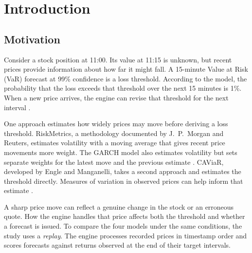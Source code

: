 \documentclass[
	12pt,				%
	openright,			%
	twoside,			%
	a4paper,
	chapter=TITLE,
	english				%
	]{abntex2}
\begin{document}
\tableofcontents*
\cleardoublepage

\textual

\chapter{Introduction} \label{cap:introducao}

\section{Motivation}

Consider a stock position at 11:00. Its value at 11:15 is unknown, but recent prices provide information about how far it might fall. A 15-minute Value at Risk (VaR) forecast at 99\% confidence is a loss threshold. According to the model, the probability that the loss exceeds that threshold over the next 15 minutes is 1\%. When a new price arrives, the engine can revise that threshold for the next interval \cite{engle-manganelli-2004}.

One approach estimates how widely prices may move before deriving a loss threshold. RiskMetrics, a methodology documented by J.\ P.\ Morgan and Reuters, estimates volatility with a moving average that gives recent price movements more weight. The GARCH model also estimates volatility but sets separate weights for the latest move and the previous estimate \cite{riskmetrics-1996,bollerslev-1986}. CAViaR, developed by Engle and Manganelli, takes a second approach and estimates the threshold directly. Measures of variation in observed prices can help inform that estimate \cite{engle-manganelli-2004,barndorff-nielsen-shephard-2002,wang-gerlach-chen-2018}.

A sharp price move can reflect a genuine change in the stock or an erroneous quote. How the engine handles that price affects both the threshold and whether a forecast is issued. To compare the four models under the same conditions, the study uses a \emph{replay}. The engine processes recorded prices in timestamp order and scores forecasts against returns observed at the end of their target intervals.
\end{document}
